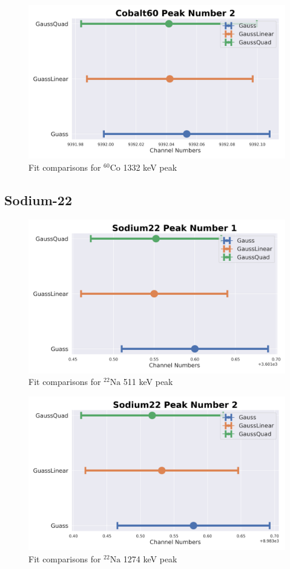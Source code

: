 \documentclass[11pt,a4paper]{article}
\newcommand{\element}[2]{$^{#2}\textrm{#1}$}
\begin{document}
\begin{figure}[H]
  \centering
  \includegraphics[width=0.95\linewidth]{./Images/Cobalt60/FitComparison_Peak2.png}
  \caption{Fit comparisons for \element{Co}{60} 1332 keV peak}
\end{figure}
\clearpage

\subsection{Sodium-22}
\begin{figure}[H]
  \centering
  \includegraphics[width=0.95\linewidth]{./Images/Sodium22/FitComparison_Peak1.png}
  \caption{Fit comparisons for \element{Na}{22} 511 keV peak}
\end{figure}

\begin{figure}[H]
  \centering
  \includegraphics[width=0.95\linewidth]{./Images/Sodium22/FitComparison_Peak2.png}
  \caption{Fit comparisons for \element{Na}{22} 1274 keV peak}
\end{figure}
\clearpage
\end{document}
